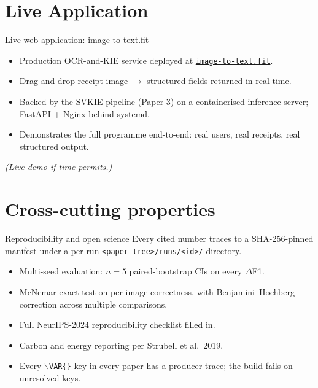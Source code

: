 \documentclass{beamer}
\begin{document}
\section{Live Application}
\begin{frame}{Live web application: image-to-text.fit}
  \begin{itemize}
    \item Production OCR-and-KIE service deployed at
          \href{https://image-to-text.fit/}{\texttt{image-to-text.fit}}.
    \item Drag-and-drop receipt image $\rightarrow$ structured fields
          returned in real time.
    \item Backed by the SVKIE pipeline (Paper 3) on a containerised
          inference server; FastAPI + Nginx behind systemd.
    \item Demonstrates the full programme end-to-end: real users,
          real receipts, real structured output.
  \end{itemize}
  \vspace{0.5em}
  \emph{(Live demo if time permits.)}
\end{frame}

\section{Cross-cutting properties}
\begin{frame}{Reproducibility and open science}
  Every cited number traces to a SHA-256-pinned manifest under a
  per-run \texttt{<paper-tree>/runs/<id>/} directory.
  \vspace{0.5em}
  \begin{itemize}
    \item Multi-seed evaluation: $n = 5$ paired-bootstrap CIs on every
          $\Delta$F1.
    \item McNemar exact test on per-image correctness, with
          Benjamini--Hochberg correction across multiple comparisons.
    \item Full NeurIPS-2024 reproducibility checklist filled in.
    \item Carbon and energy reporting per Strubell et al.\ 2019.
    \item Every \texttt{$\backslash$VAR\{\}} key in every paper has a
          producer trace; the build fails on unresolved keys.
  \end{itemize}
\end{frame}
\end{document}
